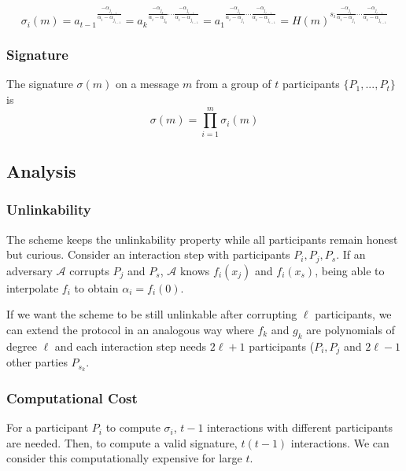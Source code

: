$$
\sigma_i (m)
= a_{t-1} {}^{\frac{- \alpha_{j_{t-1}}}{\alpha_{i} - \alpha_{j_{t-1}}}}
= a_k {}^{\frac{- \alpha_{j_{k}}}{\alpha_{i} - \alpha_{j_{k}}} \cdots \frac{- \alpha_{j_{t-1}}}{\alpha_{i} - \alpha_{j_{t-1}}}}
= a_1 {}^{\frac{- \alpha_{j_{1}}}{\alpha_{i} - \alpha_{j_{1}}} \cdots \frac{- \alpha_{j_{t-1}}}{\alpha_{i} - \alpha_{j_{t-1}}}}
= H(m)^{ s_i \frac{- \alpha_{j_{1}}}{\alpha_{i} - \alpha_{j_{1}}} \cdots \frac{- \alpha_{j_{t-1}}}{\alpha_{i} - \alpha_{j_{t-1}}}}
$$

\subsubsection*{Signature}
The signature $\sigma(m)$ on a message $m$ from a group of $t$ participants $\{P_1, ... , P_t \}$ is
$$\sigma(m) = \prod_{i=1}^m \sigma_i(m)$$

\subsection{Analysis}
\subsubsection*{Unlinkability}
The scheme keeps the unlinkability property while all participants remain honest but curious. Consider an interaction step with participants $P_i,P_j,P_s$. If an adversary $\mathcal{A}$ corrupts $P_j$ and $P_s$, $\mathcal{A}$ knows $f_i(x_j)$ and $f_i(x_s)$, being able to interpolate $f_i$ to obtain $\alpha_i = f_i(0)$.

If we want the scheme to be still unlinkable after corrupting $\ell$ participants, we can extend the protocol in an analogous way where $f_k$ and $g_k$ are polynomials of degree $\ell$ and each interaction step needs $2 \ell + 1$ participants ($P_i,P_j$ and $2 \ell - 1$ other parties $P_{s_k}$.

\subsubsection*{Computational Cost}
For a participant $P_i$ to compute $\sigma_i$, $t-1$ interactions with different participants are needed. Then, to compute a valid signature, $t(t-1)$ interactions. We can consider this computationally expensive for large $t$.
